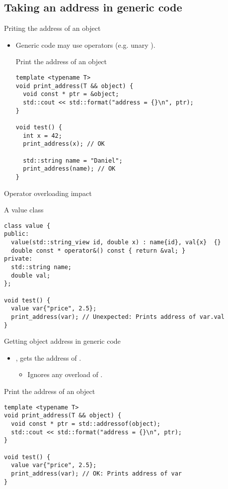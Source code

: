 \subsection{Taking an address in generic code}

\begin{frame}[t,fragile]{Priting the address of an object}
\begin{itemize}
  \item Generic code may use operators (e.g. unary \cppkey{\&}).

\begin{block}{Print the address of an object}
\begin{lstlisting}
template <typename T>
void print_address(T && object) { 
  void const * ptr = &object;
  std::cout << std::format("address = {}\n", ptr);
}

void test() {
  int x = 42;
  print_address(x); // OK

  std::string name = "Daniel";
  print_address(name); // OK
}
\end{lstlisting}
\end{block}

\end{itemize}
\end{frame}

\begin{frame}[t,fragile]{Operator overloading impact}
\begin{block}{A value class}
\begin{lstlisting}
class value {
public:
  value(std::string_view id, double x) : name{id}, val{x}  {}
  double const * operator&() const { return &val; }
private:
  std::string name;
  double val;
};

void test() {
  value var{"price", 2.5};
  print_address(var); // Unexpected: Prints address of var.val
}
\end{lstlisting}
\end{block}
\end{frame}

\begin{frame}[t,fragile]{Getting object address in generic code}
\begin{itemize}
  \item {}, gets the address of .
    \begin{itemize}
      \item Ignores any overload of .
    \end{itemize}
\end{itemize}
\begin{block}{Print the address of an object}
\begin{lstlisting}
template <typename T>
void print_address(T && object) { 
  void const * ptr = std::addressof(object);
  std::cout << std::format("address = {}\n", ptr);
}

void test() {
  value var{"price", 2.5};
  print_address(var); // OK: Prints address of var
}
\end{lstlisting}
\end{block}
\end{frame}
